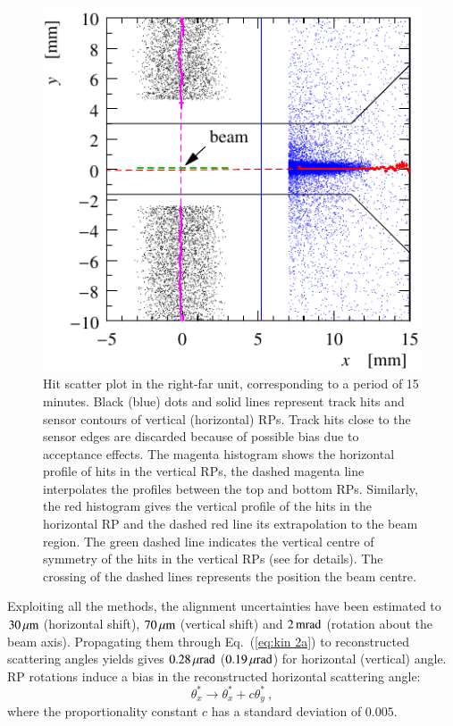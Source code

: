 \begin{figure}
\begin{center}
\includegraphics{fig/alignment_method.pdf}
\caption{%
Hit scatter plot in the right-far unit, corresponding to a period of 15 minutes. Black (blue) dots and solid lines represent track hits and sensor contours of vertical (horizontal) RPs. Track hits close to the sensor edges are discarded because of possible bias due to acceptance effects.
The magenta histogram shows the horizontal profile of hits in the vertical RPs, the dashed magenta line interpolates the profiles between the top and bottom RPs. Similarly, the red histogram gives the vertical profile of the hits in the horizontal RP and the dashed red line its extrapolation to the beam region. The green dashed line indicates the vertical centre of symmetry of the hits in the vertical RPs (see \cite{totem-ijmp} for details). The crossing of the dashed lines represents the position the beam centre.
}
\label{fig:align meth}
\end{center}
\end{figure}

Exploiting all the methods, the alignment uncertainties have been estimated to $30\,{\rm \mu m}$ (horizontal shift), $70\,{\rm \mu m}$ (vertical shift) and $2\,{\rm m rad}$ (rotation about the beam axis). Propagating them through Eq.~(\ref{eq:kin 2a}) to reconstructed scattering angles yields gives $0.28\,{\rm \mu rad}$ ($0.19\,{\rm \mu rad}$) for horizontal (vertical) angle. RP rotations induce a bias in the reconstructed horizontal scattering angle:
\begin{equation}
\label{eq:alig rot bias}
	\theta_x^* \rightarrow \theta_x^* + c \theta_y^*\ ,
\end{equation}
where the proportionality constant $c$ has a standard deviation of $0.005$.


